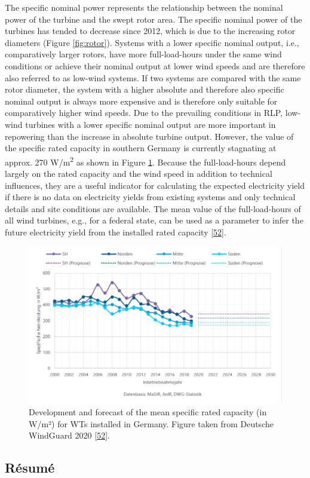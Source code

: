 \documentclass[a4paper,11pt]{article}
\begin{document}
The specific nominal power represents the relationship between the nominal power of the turbine and the swept rotor area. The specific nominal power of the turbines has tended to decrease since 2012, which is due to the increasing rotor diameters (Figure \ref{fig:rotor}). Systems with a lower specific nominal output, i.e., comparatively larger rotors, have more full-load-hours under the same wind conditions or achieve their nominal output at lower wind speeds and are therefore also referred to as low-wind systems. If two systems are compared with the same rotor diameter, the system with a higher absolute and therefore also specific nominal output is always more expensive and is therefore only suitable for comparatively higher wind speeds. Due to the prevailing conditions in RLP, low-wind turbines with a lower specific nominal output are more important in repowering than the increase in absolute turbine output. However, the value of the specific rated capacity in southern Germany is currently stagnating at approx. 270 W/m\textsuperscript{2} as shown in Figure \ref{fig:spec}. Because the full-load-hours depend largely on the rated capacity and the wind speed in addition to technical influences, they are a useful indicator for calculating the expected electricity yield if there is no data on electricity yields from existing systems and only technical details and site conditions are available. The mean value of the full-load-hours of all wind turbines, e.g., for a federal state, can be used as a parameter to infer the future electricity yield from the installed rated capacity {[}\protect\hyperlink{ref-RasmusBorrmannDr.KnudRehfeldtDr.DennisKruse.2020}{52}{]}.
\begin{figure}[H]

{\centering \includegraphics[width=1\linewidth]{figures/DWG/DWG_Spezifische_Nennleistung} 

}

\caption{Development and forecast of the mean specific rated capacity (in W/m²) for WTs installed in Germany. Figure taken from Deutsche WindGuard 2020 {[}\protect\hyperlink{ref-RasmusBorrmannDr.KnudRehfeldtDr.DennisKruse.2020}{52}{]}.}\label{fig:spec}
\end{figure}
\hypertarget{ruxe9sumuxe9}{%
\subsection{Résumé}\label{ruxe9sumuxe9}}
\end{document}
